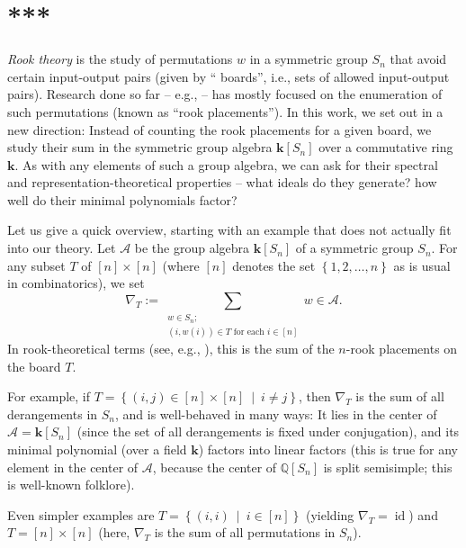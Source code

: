 \documentclass[numbers=enddot,12pt,final,onecolumn,notitlepage]{scrartcl}%
\numberwithin{exer}{subsection}
\theoremstyle{definition}
\let\sumnonlimits\sum
\renewcommand{\sum}{\sumnonlimits\limits}
\begin{document}
\section*{***}

\emph{Rook theory} is the study of permutations $w$ in a symmetric group
$S_{n}$ that avoid certain input-output pairs (given by \textquotedblleft
boards\textquotedblright, i.e., sets of allowed input-output pairs). Research
done so far -- e.g., \cite{GJW75,BCHR11,LoeRem09} -- has mostly focused on the
enumeration of such permutations (known as \textquotedblleft rook
placements\textquotedblright). In this work, we set out in a new direction:
Instead of counting the rook placements for a given board, we study their sum
in the symmetric group algebra $\mathbf{k}\left[  S_{n}\right]  $ over a
commutative ring $\mathbf{k}$. As with any elements of such a group algebra,
we can ask for their spectral and representation-theoretical properties --
what ideals do they generate? how well do their minimal polynomials factor?

Let us give a quick overview, starting with an example that does not actually
fit into our theory. Let $\mathcal{A}$ be the group algebra $\mathbf{k}\left[
S_{n}\right]  $ of a symmetric group $S_{n}$. For any subset $T$ of $\left[
n\right]  \times\left[  n\right]  $ (where $\left[  n\right]  $ denotes the
set $\left\{  1,2,\ldots,n\right\}  $ as is usual in combinatorics), we set%
\[
\nabla_{T}:=\sum_{\substack{w\in S_{n};\\\left(  i,w\left(  i\right)  \right)
\in T\text{ for each }i\in\left[  n\right]  }}w\in\mathcal{A}.
\]
In rook-theoretical terms (see, e.g., \cite[\S 1.2]{BCHR11}), this is the sum
of the $n$-rook placements on the board $T$.

For example, if $T=\left\{  \left(  i,j\right)  \in\left[  n\right]
\times\left[  n\right]  \ \mid\ i\neq j\right\}  $, then $\nabla_{T}$ is the
sum of all derangements in $S_{n}$, and is well-behaved in many ways: It lies
in the center of $\mathcal{A}=\mathbf{k}\left[  S_{n}\right]  $ (since the set
of all derangements is fixed under conjugation), and its minimal polynomial
(over a field $\mathbf{k}$) factors into linear factors (this is true for any
element in the center of $\mathcal{A}$, because the center of $\mathbb{Q}%
\left[  S_{n}\right]  $ is split semisimple; this is well-known folklore).

Even simpler examples are $T=\left\{  \left(  i,i\right)  \ \mid\ i\in\left[
n\right]  \right\}  $ (yielding $\nabla_{T}=\operatorname*{id}$) and
$T=\left[  n\right]  \times\left[  n\right]  $ (here, $\nabla_{T}$ is the sum
of all permutations in $S_{n}$).
\end{document}
